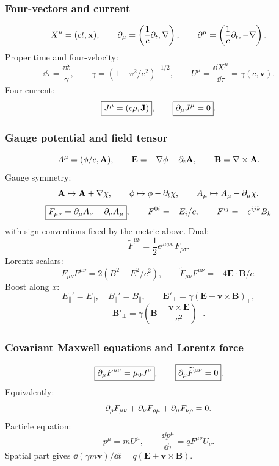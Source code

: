 \subsubsection*{Four-vectors and current}
\[
X^\mu=(ct,\mathbf x),\qquad
\partial_\mu=\left(\frac{1}{c}\partial_t,\nabla\right),\qquad
\partial^\mu=\left(\frac{1}{c}\partial_t,-\nabla\right).
\]
Proper time and four-velocity:
\[
\dd\tau=\frac{\dd t}{\gamma},\qquad
\gamma=(1-v^2/c^2)^{-1/2},\qquad
U^\mu=\frac{\dd X^\mu}{\dd\tau}=\gamma(c,\mathbf v).
\]
Four-current:
\[
\boxed{J^\mu=(c\rho,\mathbf J)},\qquad
\boxed{\partial_\mu J^\mu=0}.
\]

\subsubsection*{Gauge potential and field tensor}
\[
A^\mu=(\phi/c,\mathbf A),\qquad
\mathbf E=-\nabla\phi-\partial_t\mathbf A,\qquad
\mathbf B=\nabla\times\mathbf A.
\]
Gauge symmetry:
\[
\mathbf A\mapsto\mathbf A+\nabla\chi,\qquad
\phi\mapsto\phi-\partial_t\chi,\qquad
A_\mu\mapsto A_\mu-\partial_\mu\chi.
\]
\[
\boxed{F_{\mu\nu}=\partial_\mu A_\nu-\partial_\nu A_\mu},\qquad
F^{0i}=-E_i/c,\qquad F^{ij}=-\epsilon^{ijk}B_k
\]
with sign conventions fixed by the metric above. Dual:
\[
\widetilde F^{\mu\nu}=\frac12\epsilon^{\mu\nu\rho\sigma}F_{\rho\sigma}.
\]
Lorentz scalars:
\[
\boxed{F_{\mu\nu}F^{\mu\nu}=2(B^2-E^2/c^2)},\qquad
\boxed{\widetilde F_{\mu\nu}F^{\mu\nu}=-4\mathbf E\cdot\mathbf B/c}.
\]
Boost along $x$:
\[
E_\parallel'=E_\parallel,\quad B_\parallel'=B_\parallel,\qquad
\mathbf E'_\perp=\gamma(\mathbf E+\mathbf v\times\mathbf B)_\perp,
\]
\[
\mathbf B'_\perp=\gamma\left(\mathbf B-\frac{\mathbf v\times\mathbf E}{c^2}\right)_\perp .
\]

\subsubsection*{Covariant Maxwell equations and Lorentz force}
\[
\boxed{\partial_\mu F^{\mu\nu}=\mu_0J^\nu},\qquad
\boxed{\partial_\mu\widetilde F^{\mu\nu}=0}.
\]
Equivalently:
\[
\partial_\rho F_{\mu\nu}+\partial_\nu F_{\rho\mu}+\partial_\mu F_{\nu\rho}=0.
\]
Particle equation:
\[
p^\mu=mU^\mu,\qquad
\boxed{\frac{\dd p^\mu}{\dd\tau}=qF^{\mu\nu}U_\nu}.
\]
Spatial part gives $\dd(\gamma m\mathbf v)/\dd t=q(\mathbf E+\mathbf v\times\mathbf B)$.

